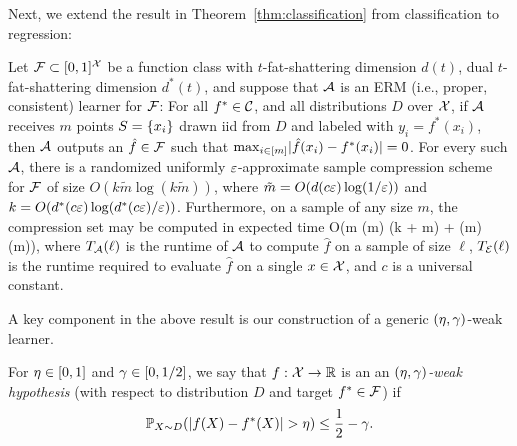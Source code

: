 Next, we extend the result in
Theorem~\ref{thm:classification}
from classification to regression:
\begin{theorem}
  \label{thm:regression}
  Let $\mathcal{F}\subset[0,1]^{\mathcal{X}}$
  be a function class
  with
  $t$-fat-shattering dimension $d(t)$,
  dual $t$-fat-shattering dimension $d^*(t)$,
  and suppose that $\mathcal{A}$ is an ERM (i.e., proper, consistent) learner for $\mathcal{F}$:
For all $f^*\in\mathcal{C}$, and all distributions $D$ over $\mathcal{X}$,
  if $\mathcal{A}$ receives $m$ 
points $S=\left\{ x_i \right\}$ drawn
  iid from $D$
  and labeled with $y_i=f^*(x_i)$,
  then
  $\mathcal{A}$ outputs
an
$\hat f\in\mathcal{F}$
such that $\max_{i\in[m]}\lvert\hat f(x_i)-f^*(x_i)\rvert=0$.
For every such $\mathcal{A}$,
there is
a randomized
uniformly $\varepsilon$-approximate sample compression scheme for $\mathcal{F}$ of size %
$O(k\tilde{m} \log( k \tilde{m} ) )$, where
$\tilde m=O(d(c\varepsilon)\log(1/\varepsilon))$
and
$k=O(d^*(c\varepsilon)\log(d^*(c\varepsilon)/\varepsilon))$.
Furthermore,
on a sample of any size $m$,
the compression set may be computed in
expected
time
\beq
O(m \teval(\tilde m) (k + \log m) +
\tlearn(\tilde m)\log(m)),
\eeq
where $T_{\mathcal{A}}(\ell)$ is the runtime of $\mathcal{A}$ to compute $\hat f$
on a sample of size $\ell$,
$T_{\mathcal{E}}(\ell)$ is the runtime required to evaluate $\hat f$ on a single $x\in\mathcal{X}$,
and $c$ is a universal constant.
\end{theorem}  


A key component in the above result is our construction
of a generic $(\eta,\gamma)$-weak learner.
\begin{definition}
  \label{def:weak}
  For $\eta \in [0,1]$ and $\gamma \in [0,1/2]$,
  we say that $f:\mathcal{X}\to\mathbb{R}$ is an  
  an \emph{$(\eta,\gamma)$-weak hypothesis}
  (with respect to distribution $D$ and target $f^*\in\mathcal{F}$)
if $$\P_{X\sim D}(|f(X)-f^*(X)|>\dev)\le \frac12-\adv.$$
\end{definition}

